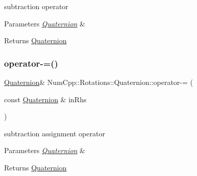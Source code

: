 subtraction operator


\begin{DoxyParams}{Parameters}
{\em \mbox{\hyperlink{class_num_cpp_1_1_rotations_1_1_quaternion}{Quaternion}}} & \\
\hline
\end{DoxyParams}
\begin{DoxyReturn}{Returns}
\mbox{\hyperlink{class_num_cpp_1_1_rotations_1_1_quaternion}{Quaternion}} 
\end{DoxyReturn}
\mbox{\label{class_num_cpp_1_1_rotations_1_1_quaternion_a0c71cbe7d90a5614bbcc50ecb1dcd3ce}} 
\subsubsection{\texorpdfstring{operator-\/=()}{operator-=()}}
{\footnotesize\ttfamily \mbox{\hyperlink{class_num_cpp_1_1_rotations_1_1_quaternion}{Quaternion}}\& Num\+Cpp\+::\+Rotations\+::\+Quaternion\+::operator-\/= (\begin{DoxyParamCaption}\item[{const \mbox{\hyperlink{class_num_cpp_1_1_rotations_1_1_quaternion}{Quaternion}} \&}]{in\+Rhs }\end{DoxyParamCaption})\hspace{0.3cm}{\ttfamily [inline]}}

subtraction assignment operator


\begin{DoxyParams}{Parameters}
{\em \mbox{\hyperlink{class_num_cpp_1_1_rotations_1_1_quaternion}{Quaternion}}} & \\
\hline
\end{DoxyParams}
\begin{DoxyReturn}{Returns}
\mbox{\hyperlink{class_num_cpp_1_1_rotations_1_1_quaternion}{Quaternion}} 
\end{DoxyReturn}
\mbox{\label{class_num_cpp_1_1_rotations_1_1_quaternion_afddb51d5a55ad36e578e1aefc639f1f5}} 
